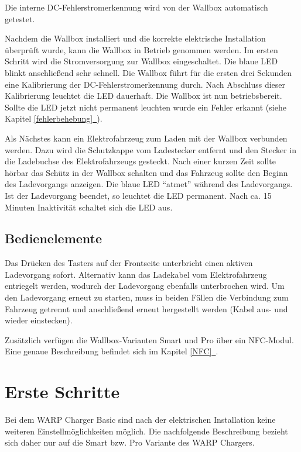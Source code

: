 \documentclass[a4paper,10pt]{article}
\newcommand*{\fullref}[1]{\hyperref[{#1}]{\ref*{#1}~\nameref*{#1}}}
\begin{document}
\begin{multicols*}{2}
	Die interne DC-Fehlerstromerkennung wird von der Wallbox automatisch getestet.

	Nachdem die Wallbox installiert
	und die korrekte elektrische Installation überprüft wurde, kann die Wallbox in
	Betrieb genommen werden.
	Im ersten Schritt wird die Stromversorgung zur Wallbox eingeschaltet. Die
	blaue LED blinkt anschließend sehr schnell. Die Wallbox führt
	für die ersten drei Sekunden eine Kalibrierung der
	DC-Fehlerstromerkennung durch. Nach Abschluss dieser Kalibrierung
	leuchtet die LED dauerhaft. Die Wallbox ist nun betriebsbereit. Sollte die LED jetzt
	nicht permanent leuchten wurde ein Fehler erkannt (siehe Kapitel \fullref{fehlerbehebung}).

	Als Nächstes kann ein Elektrofahrzeug zum Laden mit der Wallbox verbunden
	werden. Dazu wird die Schutzkappe vom Ladestecker entfernt und den Stecker in die
	Ladebuchse des Elektrofahrzeugs gesteckt. Nach einer kurzen Zeit sollte hörbar
	das Schütz in der Wallbox schalten und das Fahrzeug sollte den Beginn
	des Ladevorgangs anzeigen. Die blaue LED \enquote{atmet} während des
	Ladevorgangs. Ist der Ladevorgang beendet, so leuchtet die LED permanent. Nach ca.
	15 Minuten Inaktivität schaltet sich die LED aus.

	\subsection{Bedienelemente}\label{lockswitch}
	Das Drücken des Tasters auf der Frontseite unterbricht einen aktiven Ladevorgang
	sofort. Alternativ kann das Ladekabel vom Elektrofahrzeug entriegelt werden,
	wodurch der Ladevorgang ebenfalls unterbrochen wird. Um den Ladevorgang erneut
	zu starten, muss in beiden Fällen die Verbindung zum Fahrzeug getrennt und
	anschließend erneut hergestellt werden (Kabel aus- und wieder einstecken).

	Zusätzlich verfügen die Wallbox-Varianten Smart und Pro über ein NFC-Modul. Eine
	genaue Beschreibung befindet sich im Kapitel \fullref{NFC}.

	\newpage
	\section{Erste Schritte}\label{setup}

	Bei dem WARP Charger Basic sind nach der elektrischen Installation
	keine weiteren Einstellmöglichkeiten möglich. Die nachfolgende
	Beschreibung bezieht sich daher nur auf die Smart bzw. Pro Variante des WARP
	Chargers.


\end{multicols*}
\end{document}
